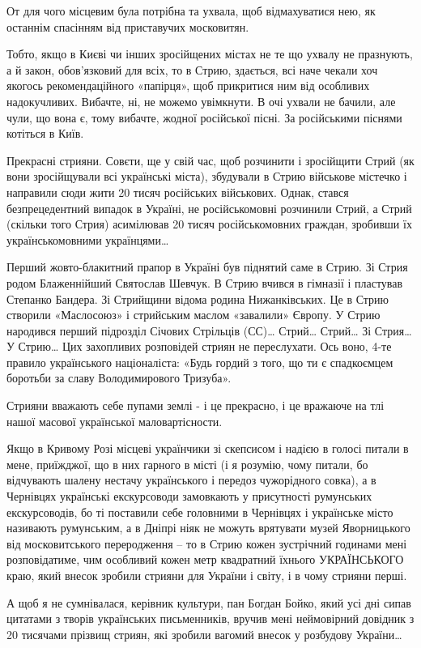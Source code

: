 От для чого місцевим була потрібна та ухвала, щоб відмахуватися нею, як
останнім спасінням від приставучих московитян.  

Тобто, якщо в Києві чи інших
зросійщених містах не те що ухвалу не празнують, а й закон, обов’язковий для
всіх, то в Стрию, здається, всі наче чекали хоч якогось рекомендаційного
«папірця», щоб прикритися ним від особливих надокучливих. Вибачте, ні, не
можемо увімкнути. В очі ухвали не бачили, але чули, що вона є, тому вибачте,
жодної російської пісні. За російськими піснями котіться в Київ.

Прекрасні стрияни. Совєти, ще у свій час, щоб розчинити і зросійщити Стрий (як
вони зросійщували всі українські міста), збудували в Стрию військове містечко і
направили сюди жити 20 тисяч російських військових. Однак, стався
безпрецедентний випадок в Україні, не російськомовні розчинили Стрий, а Стрий
(скільки того Стрия) асимілював 20 тисяч російськомовних граждан, зробивши їх
українськомовними українцями…  

Перший жовто-блакитний прапор в Україні був піднятий саме в Стрию. Зі Стрия
родом Блаженнійший Святослав Шевчук. В Стрию вчився в гімназії і пластував
Степанко Бандера. Зі Стрийщини відома родина Нижанківських. Це в Стрию створили
«Маслосоюз» і стрийським маслом «завалили» Європу. У Стрию народився перший
підрозділ Січових Стрільців (СС)… Стрий… Стрий… Зі Стрия… У Стрию… Цих
захопливих розповідей стриян не переслухати. Ось воно, 4-те правило
українського націоналіста: «Будь гордий з того, що ти є спадкоємцем боротьби за
славу Володимирового Тризуба».

Стрияни вважають себе пупами землі - і це прекрасно, і це вражаюче на тлі нашої
масової української  маловартісности. 

Якщо в Кривому Розі місцеві українчики зі скепсисом і надією в голосі питали в
мене, приїжджої, що в них гарного в місті (і я розумію, чому питали, бо
відчувають шалену нестачу українського і передоз чужорідного совка), а в
Чернівцях українські екскурсоводи замовкають у присутності румунських
екскурсоводів, бо ті поставили себе головними в Чернівцях і українське місто
називають румунським, а в Дніпрі ніяк не можуть врятувати музей Яворницького
від московитського переродження – то в Стрию кожен зустрічний годинами мені
розповідатиме, чим особливий кожен метр квадратний їхнього УКРАЇНСЬКОГО краю,
який внесок зробили стрияни для України і світу, і в чому стрияни перші. 

А щоб я не сумнівалася, керівник культури, пан Богдан Бойко, який усі дні сипав
цитатами з творів українських письменників, вручив мені неймовірний довідник з
20 тисячами прізвищ стриян, які зробили вагомий внесок у розбудову України… 


